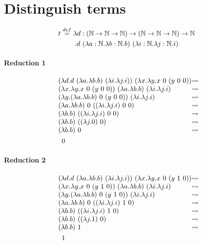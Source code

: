 \documentclass{article}
\newcommand{\N}{\ensuremath \mathbb N}
\newcommand{\lam}[2]{\ensuremath{\lambda#1.#2}}
\begin{document}
\section{Distinguish terms}
\begin{multline*}
    t\overset{def}=\lam{d:(\N\to\N\to\N)\to(\N\to\N\to\N)\to\N\\}{d\ (\lam{a:\N}{\lam{b:\N}{b}})\ (\lam{i:\N}{\lam{j:\N}{i}})}
\end{multline*}

\paragraph{Reduction 1}
\begin{align*}
    &\begin{array}{l @{\leadsto} c l}
        (\lam{d}{d\ (\lam{a}\lam{b}{b})\ (\lam{i}\lam{j}{i})})\ (\lam{x}\lam{y}{x\ 0\ (y\ 0\ 0)}) \\
        (\lam{x}\lam{y}{x\ 0\ (y\ 0\ 0)})\ (\lam{a}\lam{b}{b})\ (\lam{i}\lam{j}{i}) \\
        (\lam{y}{(\lam{a}\lam{b}{b})\ 0\ (y\ 0\ 0)})\ (\lam{i}\lam{j}{i}) \\
        (\lam{a}\lam{b}{b})\ 0\ ((\lam{i}\lam{j}{i})\ 0\ 0)\  \\
        (\lam{b}{b})\ ((\lam{i}\lam{j}{i})\ 0\ 0)\  \\
        (\lam{b}{b})\ ((\lam{j}{0})\ 0)\  \\
        (\lam{b}{b})\ 0 \\
    \end{array}\\
    &\quad 0
\end{align*}

\paragraph{Reduction 2}
\begin{align*}
    &\begin{array}{l @{\leadsto} c l}
        (\lam{d}{d\ (\lam{a}\lam{b}{b})\ (\lam{i}\lam{j}{i})})\ (\lam{x}\lam{y}{x\ 0\ (y\ 1\ 0)}) \\
        (\lam{x}\lam{y}{x\ 0\ (y\ 1\ 0)})\ (\lam{a}\lam{b}{b})\ (\lam{i}\lam{j}{i}) \\
        (\lam{y}{(\lam{a}\lam{b}{b})\ 0\ (y\ 1\ 0)})\ (\lam{i}\lam{j}{i}) \\
        (\lam{a}\lam{b}{b})\ 0\ ((\lam{i}\lam{j}{i})\ 1\ 0)\  \\
        (\lam{b}{b})\ ((\lam{i}\lam{j}{i})\ 1\ 0)\  \\
        (\lam{b}{b})\ ((\lam{j}{1})\ 0)\  \\
        (\lam{b}{b})\ 1 \\
    \end{array}\\
    &\quad 1
\end{align*}
\end{document}
